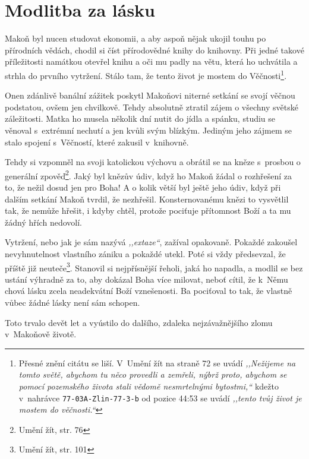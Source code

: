 \section{Modlitba za lásku}

Makoň byl nucen studovat ekonomii, a aby aspoň nějak ukojil touhu po přírodních
vědách, chodil si číst přírodovědné knihy do knihovny. Při jedné takové
příležitosti namátkou otevřel knihu a oči mu padly na větu, která ho uchvátila a
strhla do prvního vytržení. Stálo tam, že tento život je mostem do
Věčnosti\footnote{Přesné znění citátu se liší. V~Umění žít na straně 72 se
uvádí \textit{,,Nežijeme na tomto světě, abychom tu něco provedli a zemřeli,
nýbrž proto, abychom se pomocí pozemského života stali vědomě nesmrtelnými
bytostmi,``} kdežto v~nahrávce \texttt{77-03A-Zlin-77-3-b} od pozice 44:53 se
uvádí \textit{,,tento tvůj život je mostem do věčnosti.``}}.

Onen zdánlivě banální zážitek poskytl Makoňovi niterné setkání se svojí věčnou
podstatou, ovšem jen chvilkově. Tehdy absolutně ztratil zájem o všechny světské
záležitosti. Matka ho musela několik dní nutit do jídla a spánku, studiu se
věnoval s~extrémní nechutí a jen kvůli svým blízkým. Jediným jeho zájmem se
stalo spojení s~Věčností, které zakusil v~knihovně.

Tehdy si vzpomněl na svoji katolickou výchovu a obrátil se na kněze s~prosbou o
generální zpověď\footnote{Umění žít, str. 76}. Jaký byl knězův údiv, když ho Makoň žádal o rozhřešení za to,
že nežil dosud jen pro Boha! A o kolik větší byl ještě jeho údiv, když při
dalším setkání Makoň tvrdil, že nezhřešil. Konsternovanému knězi to vysvětlil
tak, že nemůže hřešit, i kdyby chtěl, protože pociťuje přítomnost Boží a ta mu
žádný hřích nedovolí.

Vytržení, nebo jak je sám nazývá \textit{,,extaze``}, zažíval opakovaně. Pokaždé
zakoušel nevyhnutelnost vlastního zániku a pokaždé utekl. Poté si vždy
předsevzal, že příště již neuteče\footnote{Umění žít, str. 101}. Stanovil si nejpřísnější řeholi, jaká ho
napadla, a modlil se bez ustání výhradně za to, aby dokázal Boha více milovat,
neboť cítil, že k~Němu chová lásku zcela neadekvátní Boží vznešenosti. Ba
pociťoval to tak, že vlastně vůbec žádné lásky není sám
schopen.

Toto trvalo devět let a vyústilo do dalšího, zdaleka nejzávažnějšího zlomu
v~Makoňově životě.

